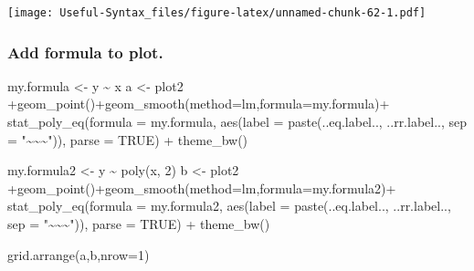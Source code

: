 \documentclass[
]{article}
\newenvironment{Shaded}{\begin{snugshade}}{\end{snugshade}}
\newcommand{\AttributeTok}[1]{\textcolor[rgb]{0.77,0.63,0.00}{#1}}
\newcommand{\ConstantTok}[1]{\textcolor[rgb]{0.00,0.00,0.00}{#1}}
\newcommand{\DecValTok}[1]{\textcolor[rgb]{0.00,0.00,0.81}{#1}}
\newcommand{\FunctionTok}[1]{\textcolor[rgb]{0.00,0.00,0.00}{#1}}
\newcommand{\NormalTok}[1]{#1}
\newcommand{\OtherTok}[1]{\textcolor[rgb]{0.56,0.35,0.01}{#1}}
\newcommand{\SpecialCharTok}[1]{\textcolor[rgb]{0.00,0.00,0.00}{#1}}
\newcommand{\StringTok}[1]{\textcolor[rgb]{0.31,0.60,0.02}{#1}}
\begin{document}
\texttt{[image: Useful-Syntax\_files/figure-latex/unnamed-chunk-62-1.pdf]}

\hypertarget{add-formula-to-plot.}{%
\subsubsection{Add formula to plot.}\label{add-formula-to-plot.}}

\begin{Shaded}
\begin{Highlighting}[]
\NormalTok{my.formula }\OtherTok{\textless{}{-}}\NormalTok{ y }\SpecialCharTok{\textasciitilde{}}\NormalTok{ x}
\NormalTok{a }\OtherTok{\textless{}{-}}\NormalTok{ plot2 }\SpecialCharTok{+}\FunctionTok{geom\_point}\NormalTok{()}\SpecialCharTok{+}\FunctionTok{geom\_smooth}\NormalTok{(}\AttributeTok{method=}\StringTok{\textquotesingle{}lm\textquotesingle{}}\NormalTok{,}\AttributeTok{formula=}\NormalTok{my.formula)}\SpecialCharTok{+}
  \FunctionTok{stat\_poly\_eq}\NormalTok{(}\AttributeTok{formula =}\NormalTok{ my.formula, }\FunctionTok{aes}\NormalTok{(}\AttributeTok{label =} \FunctionTok{paste}\NormalTok{(..eq.label.., ..rr.label..,}
                                                       \AttributeTok{sep =} \StringTok{"\textasciitilde{}\textasciitilde{}\textasciitilde{}"}\NormalTok{)), }\AttributeTok{parse =} \ConstantTok{TRUE}\NormalTok{) }\SpecialCharTok{+}
  \FunctionTok{theme\_bw}\NormalTok{()}

\NormalTok{my.formula2 }\OtherTok{\textless{}{-}}\NormalTok{ y }\SpecialCharTok{\textasciitilde{}} \FunctionTok{poly}\NormalTok{(x, }\DecValTok{2}\NormalTok{)}
\NormalTok{b }\OtherTok{\textless{}{-}}\NormalTok{ plot2 }\SpecialCharTok{+}\FunctionTok{geom\_point}\NormalTok{()}\SpecialCharTok{+}\FunctionTok{geom\_smooth}\NormalTok{(}\AttributeTok{method=}\StringTok{\textquotesingle{}lm\textquotesingle{}}\NormalTok{,}\AttributeTok{formula=}\NormalTok{my.formula2)}\SpecialCharTok{+}
  \FunctionTok{stat\_poly\_eq}\NormalTok{(}\AttributeTok{formula =}\NormalTok{ my.formula2, }\FunctionTok{aes}\NormalTok{(}\AttributeTok{label =} \FunctionTok{paste}\NormalTok{(..eq.label.., ..rr.label..,}
                                                        \AttributeTok{sep =} \StringTok{"\textasciitilde{}\textasciitilde{}\textasciitilde{}"}\NormalTok{)), }\AttributeTok{parse =} \ConstantTok{TRUE}\NormalTok{) }\SpecialCharTok{+}
  \FunctionTok{theme\_bw}\NormalTok{()}

\FunctionTok{grid.arrange}\NormalTok{(a,b,}\AttributeTok{nrow=}\DecValTok{1}\NormalTok{)}
\end{Highlighting}
\end{Shaded}
\end{document}
